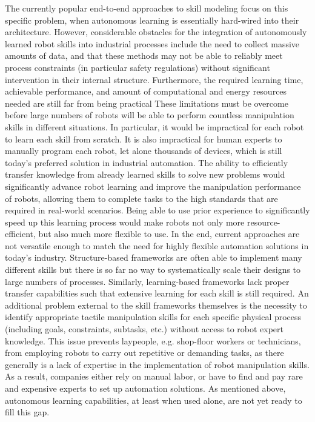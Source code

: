 The currently popular end-to-end approaches to skill modeling \cite{Levine.2015, Gu.2017} focus on this specific problem, when autonomous learning is essentially hard-wired into their architecture.
However, considerable obstacles for the integration of autonomously learned robot skills into industrial processes include the need to collect massive amounts of data, and that these methods may not be able to reliably meet process constraints (in particular safety regulations) without significant intervention in their internal structure.
Furthermore, the required learning time, achievable performance, and amount of computational and energy resources needed are still far from being practical \cite{Thompson.2020}
These limitations must be overcome before large numbers of robots will be able to perform countless manipulation skills in different situations.
In particular, it would be impractical for each robot to learn each skill from scratch.
It is also impractical for human experts to manually program each robot, let alone thousands of devices, which is still today's preferred solution in industrial automation.
The ability to efficiently transfer knowledge from already learned skills to solve new problems would significantly advance robot learning and improve the manipulation performance of robots, allowing them to complete tasks to the high standards that are required in real-world scenarios.
Being able to use prior experience to significantly speed up this learning process would make robots not only more resource-efficient, but also much more flexible to use.
In the end, current approaches are not versatile enough to match the need for highly flexible automation solutions in today's industry.
Structure-based frameworks are often able to implement many different skills but there is so far no way to systematically scale their designs to large numbers of processes.
Similarly, learning-based frameworks lack proper transfer capabilities such that extensive learning for each skill is still required.
An additional problem external to the skill frameworks themselves is the necessity to identify appropriate tactile manipulation skills for each specific physical process (including goals, constraints, subtasks, etc.) without access to robot expert knowledge.
This issue prevents laypeople, e.g. shop-floor workers or technicians, from employing robots to carry out repetitive or demanding tasks, as there generally is a lack of expertise in the implementation of robot manipulation skills.
As a result, companies either rely on manual labor, or have to find and pay rare and expensive experts to set up automation solutions.
As mentioned above, autonomous learning capabilities, at least when used alone, are not yet ready to fill this gap.
